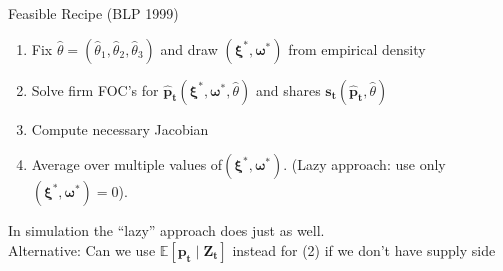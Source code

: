 


\begin{frame}{Feasible Recipe (BLP 1999)}
\begin{enumerate}
\item Fix $\widehat{\theta}=(\widehat{\theta}_1,\widehat{\theta}_2,\widehat{\theta}_3)$ and draw $(\boldsymbol{\xi}^{*},\boldsymbol{\omega}^{*})$ from empirical density
\item Solve firm FOC's for $\mathbf{\hat{p}_{t}}(\boldsymbol{\xi}^{*},\boldsymbol{\omega}^{*},\widehat{\theta})$ and shares $\mathbf{s_{t}}(\mathbf{\hat{p}_{t}},\widehat{\theta})$
\item Compute necessary Jacobian
\item Average over multiple values of$(\boldsymbol{\xi}^{*},\boldsymbol{\omega}^{*})$. (Lazy approach: use only $(\boldsymbol{\xi}^{*},\boldsymbol{\omega}^{*})=0$).
\end{enumerate}
In simulation the ``lazy'' approach does just as well.\\

 Alternative: Can we use $\mathbb{E}[ \mathbf{p_t} \mid \mathbf{Z_t}]$ instead for (2) if we don't have supply side
\end{frame}



